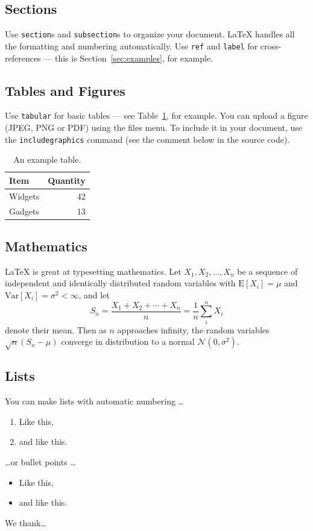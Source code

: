 \documentclass[twocolumn,showpacs,%
  nofootinbib,aps,superscriptaddress,%
  eqsecnum,prd,notitlepage,showkeys,10pt]{revtex4-1}
\begin{document}
\subsection{Sections}

Use \texttt{section}s and \texttt{subsection}s to organize your document. \LaTeX{} handles all the formatting and numbering automatically. Use \texttt{ref} and \texttt{label} for cross-references --- this is Section~\ref{sec:examples}, for example.

\subsection{Tables and Figures}

Use \texttt{tabular} for basic tables --- see Table~\ref{tab:widgets}, for example. You can upload a figure (JPEG, PNG or PDF) using the files menu. To include it in your document, use the \texttt{includegraphics} command (see the comment below in the source code).


\begin{table}
\centering
\begin{tabular}{l|r}
Item & Quantity \\\hline
Widgets & 42 \\
Gadgets & 13
\end{tabular}
\caption{\label{tab:widgets}An example table.}
\end{table}

\subsection{Mathematics}

\LaTeX{} is great at typesetting mathematics. Let $X_1, X_2, \ldots, X_n$ be a sequence of independent and identically distributed random variables with $\text{E}[X_i] = \mu$ and $\text{Var}[X_i] = \sigma^2 < \infty$, and let
$$S_n = \frac{X_1 + X_2 + \cdots + X_n}{n}
      = \frac{1}{n}\sum_{i}^{n} X_i$$
denote their mean. Then as $n$ approaches infinity, the random variables $\sqrt{n}(S_n - \mu)$ converge in distribution to a normal $\mathcal{N}(0, \sigma^2)$.

\subsection{Lists}

You can make lists with automatic numbering \dots

\begin{enumerate}
\item Like this,
\item and like this.
\end{enumerate}
\dots or bullet points \dots
\begin{itemize}
\item Like this,
\item and like this.
\end{itemize}

\begin{acknowledgments}

We thank\dots

\end{acknowledgments}
\end{document}
